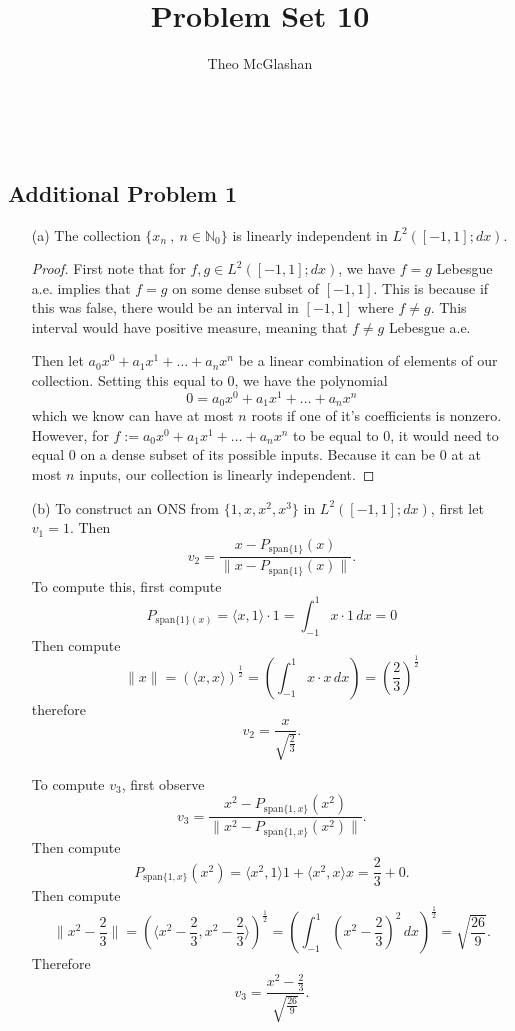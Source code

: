 \documentclass[12pt]{amsart}
\title{Problem Set 10}
\author{Theo McGlashan}
\date{}
\newcommand{\N}{\mathbb{N}}
\newcommand{\eq}[1]{\begin{equation*}#1\end{equation*}}
\begin{document}
\maketitle
\newpage
\
\newpage

\subsection*{Additional Problem 1}

\begin{itemize}
    \item [(a)] The collection $\{x_n ~,~ n \in \N_0\}$ is linearly independent in $L^2([-1, 1]; dx)$.
    
    \begin{proof}
        First note that for $f, g \in L^2([-1, 1]; dx)$, we have $f = g$ Lebesgue a.e. implies that $f = g$ on some dense subset of $[-1, 1]$. This is because if this was false, there would be an interval in $[-1, 1]$ where $f \neq g$. This interval would have positive measure, meaning that $f \neq g$ Lebesgue a.e.

        Then let $a_0x^0 + a_1x^1 + \dots + a_nx^n$ be a linear combination of elements of our collection. Setting this equal to 0, we have the polynomial
        \eq{0 = a_0x^0 + a_1x^1 + \dots + a_nx^n}
        which we know can have at most $n$ roots if one of it's coefficients is nonzero. However, for $f := a_0x^0 + a_1x^1 + \dots + a_nx^n$ to be equal to $0$, it would need to equal 0 on a dense subset of its possible inputs. Because it can be 0 at at most $n$ inputs, our collection is linearly independent.
    \end{proof}

    \item[(b)] To construct an ONS from $\{1, x, x^2, x^3\}$ in $L^2([-1, 1]; dx)$, first let $v_1 = 1$. Then
    \eq{v_2 = \frac{x - P_{\text{span}\{1\}}(x)}{\| x - P_{\text{span}\{1\}}(x) \|}.}
    To compute this, first compute
    \eq{P_{\text{span} \{1\} (x)} = \langle x, 1 \rangle \cdot 1 = \int_{-1}^{1} x \cdot 1 \,dx = 0}
    Then compute 
    \eq{\|x\| = \left(\langle x, x \rangle\right)^\frac{1}{2} = \left( \int_{-1}^{1} x \cdot x \,dx\right) = \left( \frac{2}{3}\right)^\frac{1}{2}}
    therefore
    \eq{v_2 = \frac{x}{\sqrt{\frac{2}{3}}}.}

    To compute $v_3$, first observe
    \eq{v_3 = \frac{x^2 - P_{\text{span} \{1, x\}} (x^2)}{\| x^2 - P_{\text{span} \{1, x\}} (x^2) \|}.}
    Then compute 
    \eq{P_{\text{span} \{1, x\}} (x^2) = \langle x^2, 1\rangle 1 + \langle x^2, x \rangle x = \frac{2}{3} + 0.}
    Then compute
    \eq{\|x^2 - \frac{2}{3} \| = \left( \langle x^2 - \frac{2}{3}, x^2 - \frac{2}{3} \rangle\right)^\frac{1}{2} = \left( \int_{-1}^{1} (x^2 - \frac{2}{3})^2 \,dx\right)^\frac{1}{2} = \sqrt{\frac{26}{9}}.}
    Therefore
    \eq{v_3 = \frac{x^2 - \frac{2}{3}}{\sqrt{\frac{26}{9}}}.}
    

\end{itemize}
\end{document}
